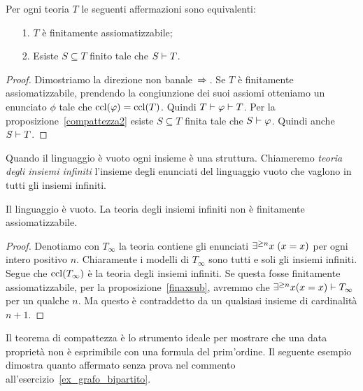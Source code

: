 \begin{proposition}\label{finaxsub} Per ogni teoria $T$ le seguenti affermazioni sono equivalenti:
\begin{itemize}
\item[1.] $T$ \`e finitamente assiomatizzabile;
\item[2.] Esiste $S\subseteq T$ finito tale che $S\vdash T$.
\end{itemize}
\end{proposition}

\begin{proof}
Dimostriamo la direzione non banale \,$\Rightarrow$\,. Se $T$ \`e finitamente assiomatizzabile, prendendo la congiunzione dei suoi assiomi otteniamo un enunciato $\phi$ tale che ${\rm ccl}(\varphi)={\rm ccl}(T)$. Quindi $T\vdash\varphi\vdash T$. Per la proposizione~\ref{compattezza2} esiste $S\subseteq T$ finita tale che $S\vdash \varphi$. Quindi anche $S\vdash T$.
\end{proof}

Quando il linguaggio \`e vuoto ogni insieme \`e una struttura. Chiameremo \emph{teoria degli insiemi infiniti\/} l'insieme degli enunciati del linguaggio vuoto che vaglono in tutti gli insiemi infiniti.

\begin{corollary} 
Il linguaggio \`e vuoto. La teoria degli insiemi infiniti non \`e finitamente assiomatizzabile. 
\end{corollary}

\begin{proof}
Denotiamo con $T_{\infty}$ la teoria contiene gli enunciati $\exists^{\ge n}x\;(x=x)$ per ogni intero positivo $n$. Chiaramente i modelli di $T_{\infty}$ sono tutti e soli gli insiemi infiniti. Segue che ${\rm ccl}(T_{\infty})$ \`e la teoria degli insiemi infiniti. Se questa fosse finitamente assiomatizzabile, per la proposizione~\ref{finaxsub}, avremmo che $\exists^{\ge n}x (x=x)\vdash T_{\infty}$ per un qualche $n$. Ma questo \`e contraddetto da un qualsiasi insieme di cardinalit\`a $n+1$.
\end{proof}


\def\ceq#1#2#3{\parbox{8ex}{$\displaystyle #1$}\parbox{5ex}{\hfil$#2$}$\displaystyle #3$}

Il teorema di compattezza \`e lo strumento ideale per mostrare che una data propriet\`a non \`e esprimibile con una formula del prim'ordine. Il seguente esempio dimostra quanto affermato senza prova nel commento all'esercizio~\ref{ex_grafo_bipartito}.

